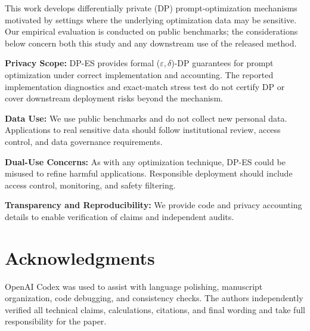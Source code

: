 \documentclass[11pt]{article}
\begin{document}
This work develops differentially private (DP) prompt-optimization mechanisms motivated by settings where the underlying optimization data may be sensitive. Our empirical evaluation is conducted on public benchmarks; the considerations below concern both this study and any downstream use of the released method.

\noindent \textbf{Privacy Scope:} DP-ES provides formal ($\varepsilon, \delta$)-DP guarantees for prompt optimization under correct implementation and accounting. The reported implementation diagnostics and exact-match stress test do not certify DP or cover downstream deployment risks beyond the mechanism.

\noindent \textbf{Data Use:} We use public benchmarks and do not collect new personal data. Applications to real sensitive data should follow institutional review, access control, and data governance requirements.

\noindent \textbf{Dual-Use Concerns:} As with any optimization technique, DP-ES could be misused to refine harmful applications. Responsible deployment should include access control, monitoring, and safety filtering.

\noindent \textbf{Transparency and Reproducibility:} We provide code and privacy accounting details to enable verification of claims and independent audits.

\section*{Acknowledgments}

OpenAI Codex was used to assist with language polishing, manuscript organization, code debugging, and consistency checks. The authors independently verified all technical claims, calculations, citations, and final wording and take full responsibility for the paper.



\clearpage
\appendix

\end{document}
